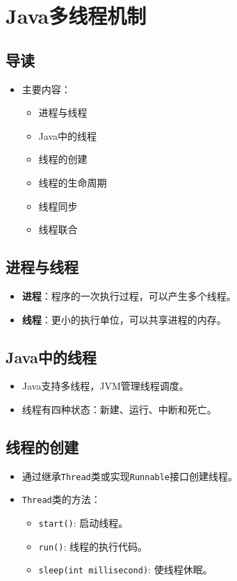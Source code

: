 \documentclass[a4paper, 10pt]{ctexart}
\begin{document}
\section{Java多线程机制}

\subsection{导读}
\begin{itemize}
  \item 主要内容：
  \begin{itemize}
    \item 进程与线程
    \item Java中的线程
    \item 线程的创建
    \item 线程的生命周期
    \item 线程同步
    \item 线程联合
  \end{itemize}
\end{itemize}

\subsection{进程与线程}
\begin{itemize}
  \item \textbf{进程}：程序的一次执行过程，可以产生多个线程。
  \item \textbf{线程}：更小的执行单位，可以共享进程的内存。
\end{itemize}

\subsection{Java中的线程}
\begin{itemize}
  \item Java支持多线程，JVM管理线程调度。
  \item 线程有四种状态：新建、运行、中断和死亡。
\end{itemize}

\subsection{线程的创建}
\begin{itemize}
  \item 通过继承\texttt{Thread}类或实现\texttt{Runnable}接口创建线程。
  \item \texttt{Thread}类的方法：
  \begin{itemize}
    \item \texttt{start()}: 启动线程。
    \item \texttt{run()}: 线程的执行代码。
    \item \texttt{sleep(int millisecond)}: 使线程休眠。
  \end{itemize}
\end{itemize}
\end{document}
